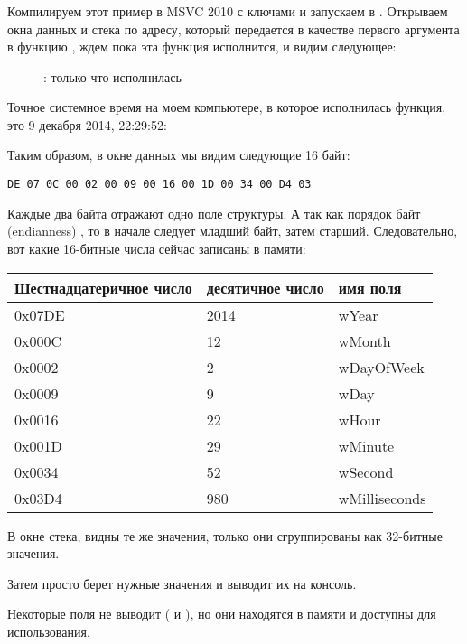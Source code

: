 ﻿\clearpage
\subsubsection{\olly}
\myindex{\olly}

Компилируем этот пример в MSVC 2010 с ключами  и запускаем в \olly.
Открываем окна данных и стека по адресу, который передается в качестве первого аргумента в функцию , 
ждем пока эта функция исполнится, и видим следующее:

\begin{figure}[H]
\centering
{}
\caption{\olly:  только что исполнилась}
\label{fig:struct_olly_1}
\end{figure}

Точное системное время на моем компьютере, в которое исполнилась функция, это 9 декабря 2014, 22:29:52:



Таким образом, в окне данных мы видим следующие 16 байт: 
\begin{lstlisting}
DE 07 0C 00 02 00 09 00 16 00 1D 00 34 00 D4 03
\end{lstlisting}

Каждые два байта отражают одно поле структуры. 
А так как порядок байт (\gls{endianness}) ,
то в начале следует младший байт, затем старший.
Следовательно, вот какие 16-битные числа сейчас записаны в памяти:

\begin{center}
\begin{tabular}{ | l | l | l | }
\hline
\headercolor{} Шестнадцатеричное число & 
\headercolor{} десятичное число & 
\headercolor{} имя поля \\
\hline
0x07DE & 2014	& wYear \\
\hline
0x000C & 12	& wMonth \\
\hline
0x0002 & 2	& wDayOfWeek \\
\hline
0x0009 & 9	& wDay \\
\hline
0x0016 & 22	& wHour \\
\hline
0x001D & 29	& wMinute \\
\hline
0x0034 & 52	& wSecond \\
\hline	
0x03D4 & 980	& wMilliseconds \\
\hline
\end{tabular}
\end{center}

В окне стека, видны те же значения, только они сгруппированы как 32-битные значения.

Затем \printf просто берет нужные значения и выводит их на консоль.

Некоторые поля \printf не выводит ( и
), но они находятся в памяти и доступны для использования.

